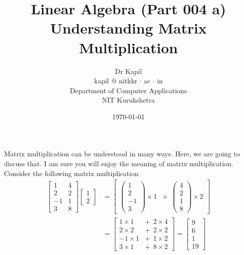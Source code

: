 \documentclass{article}
\title{Linear Algebra (Part 004 a)\\Understanding Matrix Multiplication}
\author{Dr Kapil\\kapil $@$ nitkkr $\cdot$ ac $\cdot$ in\\Department of Computer Applications\\ NIT Kurukshetra}
\date{\today}
\begin{document}
\maketitle
Matrix multiplication can be understood in many ways. Here, we are going to discuss that. I am sure you will enjoy the meaning of matrix multiplication. Consider the following matrix multiplication\\
\begin{align}
    \begin{bmatrix}
        1 & 4 \\ 2 & 2 \\ -1 & 1 \\ 3 & 8 
    \end{bmatrix} \begin{bmatrix}
        1 \\ 2
    \end{bmatrix} &= \begin{bmatrix}
        \begin{pmatrix}
            1\\   2\\
            -1\\
            3
        \end{pmatrix} \times 1 & + ~~\begin{pmatrix}
            4\\
            2\\
            1\\
            8
        \end{pmatrix} \times 2
    \end{bmatrix} \nonumber\\
    &= \begin{bmatrix}
    1 \times 1 &+~~ 2 \times 4 \\
    2 \times 2 &+~~ 2 \times 2\\
    -1 \times 1 &+~~ 1 \times 2\\
    3 \times 1 &+~~ 8 \times 2
    \end{bmatrix} = \begin{bmatrix}
        9\\
        6\\
        1\\
        19
    \end{bmatrix}\nonumber
\end{align}
\end{document}
